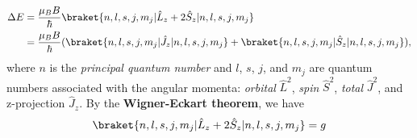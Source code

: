 \begin{align}
	\Delta E &= \frac{\mu_B B}{\hbar}\braket{n, l, s, j, m_j|\hat{L}_z + 2\hat{S}_z|n, l, s, j, m_j} \\
	&= \frac{\mu_B B}{\hbar} (\braket{n, l, s, j, m_j|\hat{J}_z|n, l, s, j, m_j} + \braket{n, l, s, j, m_j|\hat{S}_z|n, l, s, j, m_j}),
\end{align}
where $ n $ is the \textit{principal quantum number} and $ l $, $ s $, $ j $, and $ m_j $ are quantum numbers associated with the angular momenta: \textit{orbital} $ \hat{L}^2 $, \textit{spin} $ \hat{S}^2 $, \textit{total} $ \hat{J}^2 $, and z-projection $ \hat{J}_z $. By the \textbf{Wigner-Eckart theorem}, we have
\begin{equation}
	\braket{n, l, s, j, m_j|\hat{L}_z + 2\hat{S}_z|n, l, s, j, m_j} = g
\end{equation}